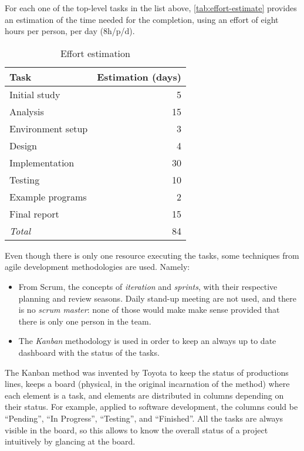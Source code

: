 For each one of the top-level tasks in the list above,
\autoref{tab:effort-estimate} provides an estimation of the time needed for
the completion, using an effort of eight hours per person, per day (8h/p/d).

\begin{table}
	\centering
	\begin{tabular}{lr}
		\toprule
		Task & Estimation (days) \\
		\midrule
		Initial study     &  5 \\
		Analysis          & 15 \\
		Environment setup &  3 \\
		Design            &  4 \\
		Implementation    & 30 \\
		Testing           & 10 \\
		Example programs  &  2 \\
		Final report      & 15 \\
		\midrule
		\emph{Total}      & 84 \\
		\bottomrule
	\end{tabular}
	\caption{Effort estimation}
	\label{tab:effort-estimate}
\end{table}

Even though there is only one resource executing the tasks, some techniques
from agile development methodologies are used. Namely:

\begin{itemize}
	\item From Scrum, the concepts of \emph{iteration} and \emph{sprints}, with
    their respective planning and review seasons. Daily stand-up meeting are
    not used, and there is no \emph{scrum master}: none of those would make
    make sense provided that there is only one person in the team.
  \item The \emph{Kanban} methodology is used in order to keep an always
		up to date dashboard with the status of the tasks.
\end{itemize}

The Kanban method was invented by \gls{Toyota} to keep the status of
productions lines, keeps a board (physical, in the original incarnation of the
method) where each element is a task, and elements are distributed in columns
depending on their status. For example, applied to software development, the
columns could be “Pending”, “In Progress”, “Testing”, and “Finished”. All the
tasks are always visible in the board, so this allows to know the overall
status of a project intuitively by glancing at the board.
